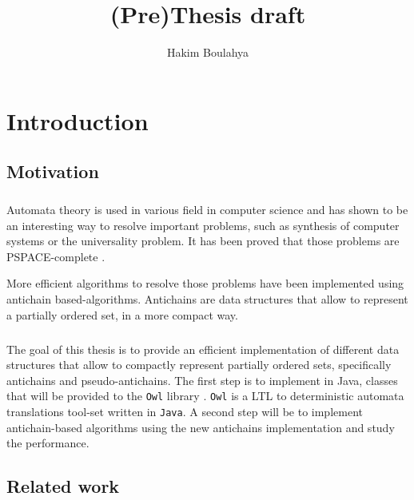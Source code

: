 \documentclass[letterpaper]{memoir}
\title{(Pre)Thesis draft}
\author{Hakim Boulahya}
\begin{document}
\maketitle

\tableofcontents

\listoftodos

\chapter{Introduction}


\section{Motivation}

\paragraph{}


Automata theory is used in various field in computer science and has shown
to be an interesting way to resolve important problems,
such as synthesis of computer systems
or the universality problem. It has been proved that those problems are
PSPACE-complete \cite{bsp, ant_univers}.

More efficient algorithms to resolve those problems have been implemented
using antichain based-algorithms. Antichains are data structures that allow
to represent a partially ordered set, in a more compact way.

\paragraph{}


The goal of this thesis is to provide an efficient implementation of different
data structures that allow to compactly
represent partially ordered sets, specifically antichains and pseudo-antichains.
The first step is to implement in Java, classes that will be provided to
the \texttt{Owl} library \cite{owl}.
\texttt{Owl} is a LTL to deterministic automata translations tool-set written
in \texttt{Java}. A second step will be to implement
antichain-based algorithms using the new antichains implementation and
study the performance.


\section{Related work}
\end{document}
